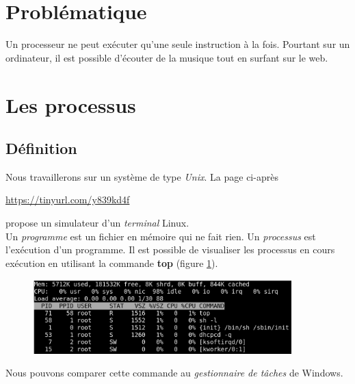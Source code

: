 \documentclass[a4paper,11pt]{article}
\begin{document}
\begin{Form}
\section{Problématique}
Un processeur ne peut exécuter qu'une seule instruction à la fois. Pourtant sur un ordinateur, il est possible d'écouter de la musique tout en surfant sur le web.
\begin{center}
\end{center}
\section{Les processus}
\subsection{Définition}
Nous travaillerons sur un système de type \emph{Unix}. La page ci-après
\begin{center}
\url{https://tinyurl.com/y839kd4f}
\end{center}
propose un simulateur d'un \emph{terminal} Linux.\\
Un \emph{programme} est un fichier en mémoire qui ne fait rien. Un \emph{processus} est l'exécution d'un programme. Il est possible de visualiser les processus en cours exécution en utilisant la commande \textbf{top} (figure \ref{top}).
\begin{figure}[!h]
\centering
\includegraphics[width=10cm]{ressources/top.png}
\label{top}
\end{figure}
Nous pouvons comparer cette commande au \emph{gestionnaire de tâches} de Windows.

\end{Form}
\end{document}
